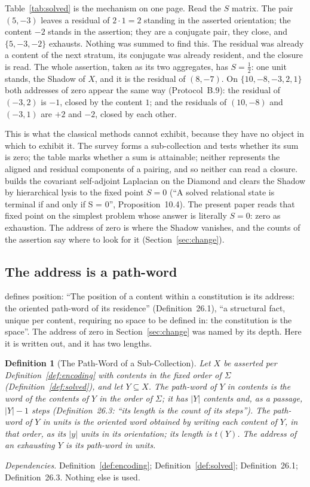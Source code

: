 \documentclass[pdflatex,sn-mathphys-num]{sn-jnl}
\theoremstyle{thmstyleone}%
\theoremstyle{thmstyletwo}%
\theoremstyle{thmstylethree}%
\newtheorem{definition}{Definition}[section]
\newtheorem{definition}{Definition}[section]
\newcommand{\PA}{\cite{Swanagon2026PA}}
\newcommand{\q}[1]{``#1''}        %
\newcommand{\qq}[1]{``#1''}       %
\newcommand{\YM}{\cite{Swanagon2026YangMills}}
\newcommand{\deps}[1]{\par\begin{sloppypar}\noindent\emph{Dependencies.} #1 Nothing else is used.\end{sloppypar}}
\begin{document}
Table~\ref{tab:solved} is the mechanism on one page. Read the $S$ matrix. The pair $(5,-3)$ leaves a residual of $2\cdot1=2$ standing in the asserted orientation; the content $-2$ stands in the assertion; they are a conjugate pair, they close, and $\{5,-3,-2\}$ exhausts. Nothing was summed to find this. The residual was already a content of the next stratum, its conjugate was already resident, and the closure is read. The whole assertion, taken as its two aggregates, has $S=\tfrac12$: one unit stands, the Shadow of $X$, and it is the residual of $(8,-7)$. On $\{10,-8,-3,2,1\}$ both addresses of zero appear the same way (Protocol~B.9): the residual of $(-3,2)$ is $-1$, closed by the content $1$; and the residuals of $(10,-8)$ and $(-3,1)$ are $+2$ and $-2$, closed by each other.

This is what the classical methods cannot exhibit, because they have no object in which to exhibit it. The survey forms a sub-collection and tests whether its sum is zero; the table marks whether a sum is attainable; neither represents the aligned and residual components of a pairing, and so neither can read a closure. \YM{} builds the covariant self-adjoint Laplacian on the Diamond and clears the Shadow by hierarchical lysis to the fixed point $S=0$ (\qq{A solved relational state is terminal if and only if S = 0}, Proposition~10.4). The present paper reads that fixed point on the simplest problem whose answer is literally $S=0$: zero as exhaustion. The address of zero is where the Shadow vanishes, and the counts of the assertion say where to look for it (Section~\ref{sec:change}).

\subsection{The address is a path-word}\label{sec:pathword}
\PA{} defines position: \q{The position of a content within a constitution is its address: the oriented path-word of its residence} (Definition~26.1), \q{a structural fact, unique per content, requiring no space to be defined in: the constitution is the space}. The address of zero in Section~\ref{sec:change} was named by its depth. Here it is written out, and it has two lengths.

\begin{definition}[The Path-Word of a Sub-Collection]\label{def:pathword}
Let $X$ be asserted per Definition~\ref{def:encoding} with contents in the fixed order of $\Sigma$ (Definition~\ref{def:solved}), and let $Y\subseteq X$. The \emph{path-word of $Y$ in contents} is the word of the contents of $Y$ in the order of $\Sigma$; it has $|Y|$ contents and, as a passage, $|Y|-1$ steps (Definition~26.3: \q{its length is the count of its steps}). The \emph{path-word of $Y$ in units} is the oriented word obtained by writing each content of $Y$, in that order, as its $|y|$ units in its orientation; its length is $t(Y)$. The \emph{address} of an exhausting $Y$ is its path-word in units.
\end{definition}
\deps{Definition~\ref{def:encoding}; Definition~\ref{def:solved}; Definition~26.1; Definition~26.3.}
\end{document}
